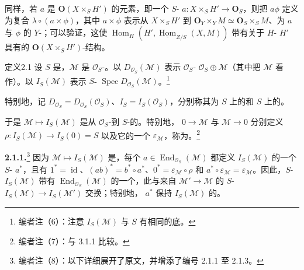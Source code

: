 同样，若 $a$ 是 $\mathbf O(X\times_S H')$ 的元素，即一个 $S$- $a:X\times_S H'\to\mathbf O_S$，则把 $a\phi$ 定义为复合 $\lambda\circ(a\times\phi)$，其中 $a\times\phi$ 表示从 $X\times_S H'$ 到 $\mathbf O_Y\times_Y M\simeq\mathbf O_S\times_S M$、为 $a$ 与 $\phi$ 的 $Y$-；可以验证，这使 $\operatorname{Hom}_H(H',\underline{\operatorname{Hom}}_{Z/S}(X,M))$ 带有关于 $H$- $H'$ 具有的 $\mathbf O(X\times_S H')$-结构。

\begin{SGAresult}{定义}{2.1}
设 $S$ 是，$\mathcal M$ 是 $\mathcal O_S$-。以 $D_{\mathcal O_S}(\mathcal M)$ 表示 $\mathcal O_S$- $\mathcal O_S\oplus\mathcal M$（其中把 $\mathcal M$ 看作）。以 $I_S(\mathcal M)$ 表示 $S$- $\operatorname{Spec}D_{\mathcal O_S}(\mathcal M)$。\footnote{编者注（6）：注意 $I_S(\mathcal M)$ 与 $S$ 有相同的底。}

特别地，记 $D_{\mathcal O_S}=D_{\mathcal O_S}(\mathcal O_S)$、$I_S=I_S(\mathcal O_S)$，分别称其为 $S$ 上的和 $S$ 上的。
\end{SGAresult}
于是 $\mathcal M\mapsto I_S(\mathcal M)$ 是从 $\mathcal O_S$-到 $S$-的。特别地， $0\to\mathcal M$ 与 $\mathcal M\to0$ 分别定义 $\rho:I_S(\mathcal M)\to I_S(0)=S$ 以及它的一个 $\varepsilon_{\mathcal M}$，称为。\footnote{编者注（7）：与 3.1.1 比较。}

\textbf{2.1.1.}\footnote{编者注（8）：以下详细展开了原文，并增添了编号 2.1.1 至 2.1.3。} 因为 $\mathcal M\mapsto I_S(\mathcal M)$ 是，每个 $a\in\operatorname{End}_{\mathcal O_S}(\mathcal M)$ 都定义 $I_S(\mathcal M)$ 的一个 $S$- $a^*$，且有 $1^*=\operatorname{id}$、$(ab)^*=b^*\circ a^*$、$0^*=\varepsilon_{\mathcal M}\circ\rho$ 和 $a^*\circ\varepsilon_{\mathcal M}=\varepsilon_{\mathcal M}$。因此，$S$- $I_S(\mathcal M)$ 带有 $\operatorname{End}_{\mathcal O_S}(\mathcal M)$ 的一个，此与来自 $\mathcal M'\to\mathcal M$ 的 $S$- $I_S(\mathcal M)\to I_S(\mathcal M')$ 交换；特别地， $a^*$ 保持 $I_S(\mathcal M)$ 的。

